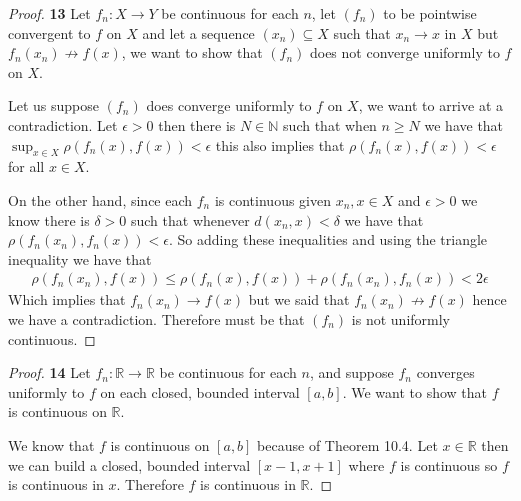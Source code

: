 \documentclass[11pt]{article}
\newcommand{\N}{\mathbb{N}}
\newcommand{\R}{\mathbb{R}}
\theoremstyle{definition}
\begin{document}
\cleardoublepage
\begin{proof}{\textbf{13}}
    Let $f_n:X \to Y$ be continuous for each $n$, let $(f_n)$ to be pointwise
    convergent to $f$ on $X$ and let a sequence $(x_n) \subseteq X$ such that
    $x_n \to x$ in $X$ but $f_n(x_n) \not\to f(x)$, we want to show that
    $(f_n)$ does not converge uniformly to $f$ on $X$.

    Let us suppose $(f_n)$ does converge uniformly to $f$ on $X$, we want to
    arrive at a contradiction. Let $\epsilon > 0$ then there is $N\in\N$
    such that when $n \geq N$ we have that $\sup_{x\in X}\rho(f_n(x), f(x))<\epsilon$
    this also implies that $\rho(f_n(x), f(x))<\epsilon$ for all $x \in X$.

    On the other hand, since each $f_n$ is continuous given $x_n, x \in X$
    and $\epsilon > 0$ we know there is $\delta > 0$ such that whenever
    $d(x_n, x) < \delta$ we have that $\rho(f_n(x_n), f_n(x)) < \epsilon$.
    So adding these inequalities and using the triangle inequality we have that
    \begin{align*}
        \rho(f_n(x_n), f(x)) \leq
        \rho(f_n(x), f(x)) + \rho(f_n(x_n), f_n(x)) < 2\epsilon
    \end{align*}
    Which implies that $f_n(x_n) \to f(x)$ but we said that
    $f_n(x_n) \not\to f(x)$ hence we have a contradiction.
    Therefore must be that $(f_n)$ is not uniformly continuous.
\end{proof}
\begin{proof}{\textbf{14}}
    Let $f_n:\R \to \R$ be continuous for each $n$, and suppose $f_n$ converges
    uniformly to $f$ on each closed, bounded interval $[a,b]$. We want to
    show that $f$ is continuous on $\R$.

    We know that $f$ is continuous on $[a,b]$ because of Theorem 10.4.
    Let $x \in \R$ then we can build a closed, bounded interval $[x-1, x+1]$
    where $f$ is continuous so $f$ is continuous in $x$. Therefore $f$
    is continuous in $\R$.
\end{proof}
\end{document}

